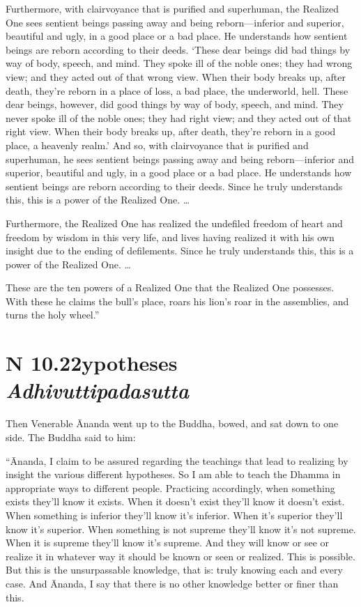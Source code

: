 \documentclass[12pt,openany]{book}%
\newcommand*{\suttatitleacronym}[1]{\smaller[2]{#1}\vspace*{.3em}}
\newcommand*{\suttatitletranslation}[1]{\linebreak{#1}}
\newcommand*{\suttatitleroot}[1]{\linebreak\smaller[2]\itshape{#1}}
\newcommand*{\tocacronym}[1]{\hspace*{-3.3em}{#1}\quad}
\newcommand*{\toctranslation}[1]{#1}
\newcommand*{\tocroot}[1]{(\textit{#1})}
\begin{document}
Furthermore, with clairvoyance that is purified and superhuman, the Realized One sees sentient beings passing away and being reborn—inferior and superior, beautiful and ugly, in a good place or a bad place. He understands how sentient beings are reborn according to their deeds. ‘These dear beings did bad things by way of body, speech, and mind. They spoke ill of the noble ones; they had wrong view; and they acted out of that wrong view. When their body breaks up, after death, they’re reborn in a place of loss, a bad place, the underworld, hell. These dear beings, however, did good things by way of body, speech, and mind. They never spoke ill of the noble ones; they had right view; and they acted out of that right view. When their body breaks up, after death, they’re reborn in a good place, a heavenly realm.’ And so, with clairvoyance that is purified and superhuman, he sees sentient beings passing away and being reborn—inferior and superior, beautiful and ugly, in a good place or a bad place. He understands how sentient beings are reborn according to their deeds. Since he truly understands this, this is a power of the Realized One. … 

Furthermore, the Realized One has realized the undefiled freedom of heart and freedom by wisdom in this very life, and lives having realized it with his own insight due to the ending of defilements. Since he truly understands this, this is a power of the Realized One. … 

These are the ten powers of a Realized One that the Realized One possesses. With these he claims the bull’s place, roars his lion’s roar in the assemblies, and turns the holy wheel.” 

%
\section*{{\suttatitleacronym AN 10.22}{\suttatitletranslation Hypotheses }{\suttatitleroot Adhivuttipadasutta}}
\addcontentsline{toc}{section}{\tocacronym{AN 10.22} \toctranslation{Hypotheses } \tocroot{Adhivuttipadasutta}}

Then Venerable Ānanda went up to the Buddha, bowed, and sat down to one side. The Buddha said to him: 

“Ānanda, I claim to be assured regarding the teachings that lead to realizing by insight the various different hypotheses. So I am able to teach the Dhamma in appropriate ways to different people. Practicing accordingly, when something exists they’ll know it exists. When it doesn’t exist they’ll know it doesn’t exist. When something is inferior they’ll know it’s inferior. When it’s superior they’ll know it’s superior. When something is not supreme they’ll know it’s not supreme. When it is supreme they’ll know it’s supreme. And they will know or see or realize it in whatever way it should be known or seen or realized. This is possible. But this is the unsurpassable knowledge, that is: truly knowing each and every case. And Ānanda, I say that there is no other knowledge better or finer than this. 
\end{document}
